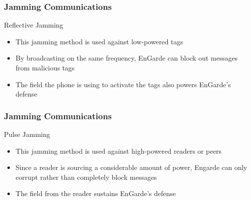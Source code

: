 \documentclass[unknownkeysallowed]{beamer}
\begin{document}




\begin{frame}
\frametitle{Jamming Communications}
  \begin{center}
  \begin{minipage}{.9\textwidth}
  \begin{block}{Reflective Jamming}
    \begin{itemize}
      \item{This jamming method is used against low-powered tags}
      \pause
      \vspace{1mm}
      \item{By broadcasting on the same frequency, EnGarde can block out messages from malicious tags}
      \pause
      \vspace{1mm}
      \item{The field the phone is using to activate the tags also powers EnGarde's defense}
    \end{itemize}
  \end{block}
  \end{minipage}
  \end{center}
\end{frame}

\begin{frame}
\frametitle{Jamming Communications}
  \begin{center}
  \begin{minipage}{.9\textwidth}
  \begin{block}{Pulse Jamming}
    \begin{itemize}
      \item{This jamming method is used against high-powered readers or peers}
      \pause
      \vspace{1mm}
      \item{Since a reader is sourcing a considerable amount of power, Engarde can only corrupt rather than completely block messages}
      \pause
      \vspace{1mm}
      \item{The field from the reader sustains EnGarde's defense}
    \end{itemize}
  \end{block}
  \end{minipage}
  \end{center}
\end{frame}
\end{document}
